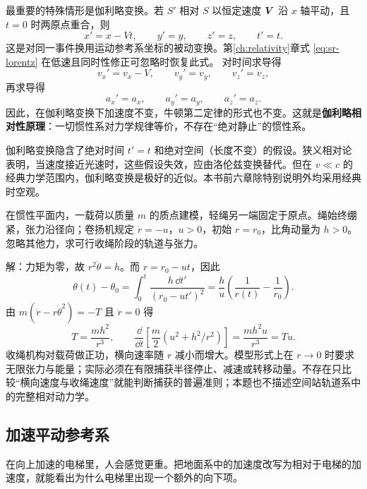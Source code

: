 最重要的特殊情形是伽利略变换。若 $S'$ 相对 $S$ 以恒定速度 $\boldsymbol{V}$ 沿 $x$ 轴平动，且 $t=0$ 时两原点重合，则
\begin{equation}
x'=x-Vt,\qquad y'=y,\qquad z'=z,\qquad t'=t.
\label{eq:galilean}
\end{equation}
这是对同一事件换用运动参考系坐标的被动变换。第\ref{ch:relativity}章式 \eqref{eq:sr-lorentz} 在低速且同时性修正可忽略时恢复此式。
对时间求导得
\begin{equation}
v_x'=v_x-V,\qquad v_y'=v_y,\qquad v_z'=v_z,
\end{equation}
再求导得
\begin{equation}
a_x'=a_x,\qquad a_y'=a_y,\qquad a_z'=a_z .
\end{equation}
因此，在伽利略变换下加速度不变，牛顿第二定律的形式也不变。这就是\textbf{伽利略相对性原理}：一切惯性系对力学规律等价，不存在“绝对静止”的惯性系。

\begin{modernbox}
伽利略变换隐含了绝对时间 $t'=t$ 和绝对空间（长度不变）的假设。狭义相对论表明，当速度接近光速时，这些假设失效，应由洛伦兹变换替代。但在 $v\ll c$ 的经典力学范围内，伽利略变换是极好的近似。本书前六章除特别说明外均采用经典时空观。
\end{modernbox}

\begin{example}
在惯性平面内，一载荷以质量 $m$ 的质点建模，轻绳另一端固定于原点。绳始终绷紧，张力沿径向；卷扬机规定 $\dot r=-u$，$u>0$，初始 $r=r_0$，比角动量为 $h>0$。忽略其他力，求可行收绳阶段的轨道与张力。

解：力矩为零，故 $r^2\dot\theta=h$。而 $r=r_0-ut$，因此
\[
\theta(t)-\theta_0=\int_0^t\frac{h\,\dd t'}{(r_0-ut')^2}
=\frac hu\left(\frac1{r(t)}-\frac1{r_0}\right).
\]
由 $m(\ddot r-r\dot\theta^2)=-T$ 且 $\ddot r=0$ 得
\[
T=\frac{mh^2}{r^3},\qquad
\frac{\dd}{\dd t}\left[\frac m2(u^2+h^2/r^2)\right]
=\frac{mh^2u}{r^3}=Tu.
\]
收绳机构对载荷做正功，横向速率随 $r$ 减小而增大。模型形式上在 $r\to0$ 时要求无限张力与能量；实际必须在有限捕获半径停止、减速或转移动量。不存在只比较“横向速度与收绳速度”就能判断捕获的普遍准则；本题也不描述空间站轨道系中的完整相对动力学。
\end{example}



\subsection{加速平动参考系}

在向上加速的电梯里，人会感觉更重。把地面系中的加速度改写为相对于电梯的加速度，就能看出为什么电梯里出现一个额外的向下项。

